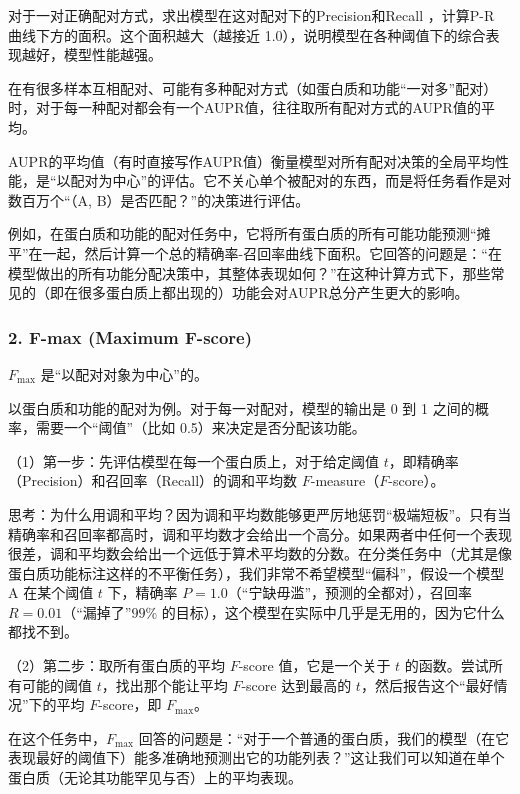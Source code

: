 对于一对正确配对方式，求出模型在这对配对下的Precision和Recall ，计算P-R 曲线下方的面积。这个面积越大（越接近 1.0），说明模型在各种阈值下的综合表现越好，模型性能越强。

在有很多样本互相配对、可能有多种配对方式（如蛋白质和功能``一对多''配对）时，对于每一种配对都会有一个AUPR值，往往取所有配对方式的AUPR值的平均。

AUPR的平均值（有时直接写作AUPR值）衡量模型对所有配对决策的全局平均性能，是``以配对为中心''的评估。它不关心单个被配对的东西，而是将任务看作是对数百万个``（A, B）是否匹配？''的决策进行评估。

例如，在蛋白质和功能的配对任务中，它将所有蛋白质的所有可能功能预测``摊平''在一起，然后计算一个总的精确率-召回率曲线下面积。它回答的问题是：``在模型做出的所有功能分配决策中，其整体表现如何？''在这种计算方式下，那些常见的（即在很多蛋白质上都出现的）功能会对AUPR总分产生更大的影响。

\hypertarget{f-max-maximum-f-score}{%
\subsubsection{2. F-max (Maximum F-score)}\label{f-max-maximum-f-score}}

\(F_{\max}\) 是``以配对对象为中心''的。

以蛋白质和功能的配对为例。对于每一对配对，模型的输出是 0 到 1 之间的概率，需要一个``阈值''（比如 0.5）来决定是否分配该功能。

（1）第一步：先评估模型在每一个蛋白质上，对于给定阈值 \(t\)，即精确率（Precision）和召回率（Recall）的调和平均数 \(F\)-measure（\(F\)-score）。

思考：为什么用调和平均？因为调和平均数能够更严厉地惩罚``极端短板''。只有当精确率和召回率都高时，调和平均数才会给出一个高分。如果两者中任何一个表现很差，调和平均数会给出一个远低于算术平均数的分数。在分类任务中（尤其是像蛋白质功能标注这样的不平衡任务），我们非常不希望模型``偏科''，假设一个模型 A 在某个阈值 \(t\) 下，精确率 \(P=1.0\)（``宁缺毋滥''，预测的全都对），召回率 \(R=0.01\)（``漏掉了''\(99\%\) 的目标），这个模型在实际中几乎是无用的，因为它什么都找不到。

（2）第二步：取所有蛋白质的平均 \(F\)-score 值，它是一个关于 \(t\) 的函数。尝试所有可能的阈值 \(t\)，找出那个能让平均 \(F\)-score 达到最高的 \(t\)，然后报告这个``最好情况''下的平均 \(F\)-score，即 \(F_{\max}\)。

在这个任务中，\(F_{\max}\) 回答的问题是：``对于一个普通的蛋白质，我们的模型（在它表现最好的阈值下）能多准确地预测出它的功能列表？''这让我们可以知道在单个蛋白质（无论其功能罕见与否）上的平均表现。

